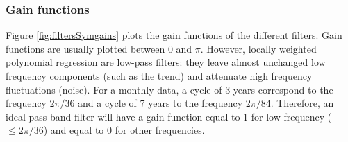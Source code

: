\documentclass[
  12pt,
  ,
  a4paper]{article}
\newcommand\1{\mathds{1}}
\begin{document}
\begin{table}[!h]

\caption{\label{tab:varianceReductionSymmetricFilters}Variance reduction ratio ($\sum\theta_i^2$) of symmetric filters computed by local polynomial of degree $3$.}
\centering
{}
\end{table}

\hypertarget{gain-functions}{%
\subsubsection{Gain functions}\label{gain-functions}}

Figure \ref{fig:filtersSymgains} plots the gain functions of the different filters.
Gain functions are usually plotted between 0 and \(\pi\).
However, locally weighted polynomial regression are low-pass filters: they leave almost unchanged low frequency components (such as the trend) and attenuate high frequency fluctuations (noise).
For a monthly data, a cycle of 3 years correspond to the frequency \(2\pi/36\) and a cycle of 7 years to the frequency \(2\pi/84\).
Therefore, an ideal pass-band filter will have a gain function equal to 1 for low frequency (\(\leq 2\pi/36\)) and equal to 0 for other frequencies.
\end{document}
